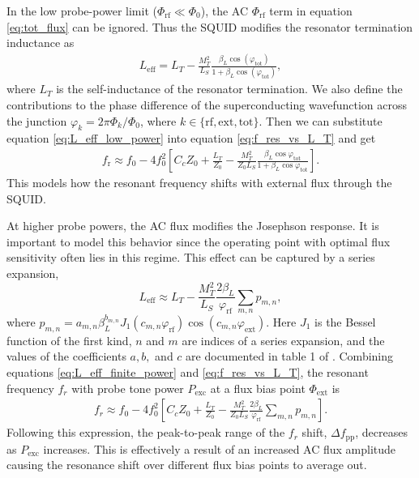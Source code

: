 \documentclass[10pt]{iopart}
\begin{document}
In the low probe-power limit ($\Phi_{\mathrm{rf}} \ll \Phi_0$), the AC $\Phi_{\text{rf}}$ term in equation \eqref{eq:tot_flux} can be ignored. Thus the SQUID modifies the resonator termination inductance as \cite{mates_microwave_2011}
\begin{gather} \label{eq:L_eff_low_power}
    L_{\text{eff}} = L_T - \frac{M_T^2}{L_S} \frac{\beta_L \cos(\varphi_{\text{tot}})}{1+\beta_L \cos(\varphi_{\text{tot}})},
\end{gather}
where $L_T$ is the self-inductance of the resonator termination. We also define the contributions to the phase difference of the superconducting wavefunction across the junction $\varphi_k = 2\pi \Phi_k/\Phi_0$, where \mbox{$k\in\{\text{rf}, \text{ext}, \text{tot}\}$}. Then we can substitute equation \eqref{eq:L_eff_low_power} into equation \eqref{eq:f_res_vs_L_T} and get
\begin{gather} \label{eq:squid_dispersion_low_pwr}
f_{\text{r}} \approx f_0 - 4f_0^2\left[C_c Z_0 + \frac{L_T}{Z_0} - \frac{M_T^2}{Z_0 L_S} \frac{\beta_L \cos{\varphi_{\text{tot}}}}{1+\beta_L \cos{\varphi_{\text{tot}}}}\right].
\end{gather}
This models how the resonant frequency shifts with external flux through the SQUID.


At higher probe powers, the AC flux modifies the Josephson response. It is important to model this behavior since the operating point with optimal flux sensitivity often lies in this regime. This effect can be captured by a series expansion,
\begin{equation} \label{eq:L_eff_finite_power}
L_{\mathrm{eff}} \approx L_T - \frac{M_T^2}{L_S}
\frac{2\beta_L}{\varphi_{\mathrm{rf}}}
\sum_{m,n} p_{m,n},
\end{equation}
where $p_{m,n} = a_{m,n} \beta_L^{b_{m,n}} J_1(c_{m,n}\varphi_{\text{rf}}) \cos(c_{m,n} \varphi_{\text{ext}})$. Here $J_1$ is the Bessel function of the first kind, $n$ and $m$ are indices of a series expansion, and the values of the coefficients $a, b,$ and $c$ are documented in table 1 of \cite{wegner_analytical_2022}. Combining equations \eqref{eq:L_eff_finite_power} and \eqref{eq:f_res_vs_L_T}, the resonant frequency $f_r$ with probe tone power $P_{\text{exc}}$ at a flux bias point $\Phi_{\text{ext}}$ is
\begin{gather} \label{eq:squid_dispersion_finite_pwr}
    f_r \approx f_0 - 4 f_0^2 \left[ C_c Z_0 + \frac{L_T}{Z_0} - \frac{M_T^2}{Z_0 L_S} \frac{2 \beta_L}{\varphi_{\text{rf}}} \sum_{m,n} p_{m,n}\right].
\end{gather}
Following this expression, the peak-to-peak range of the $f_r$ shift, $\Delta f_{\text{pp}}$, decreases as $P_{\text{exc}}$ increases. This is effectively a result of an increased AC flux amplitude causing the resonance shift over different flux bias points to average out.
\end{document}
